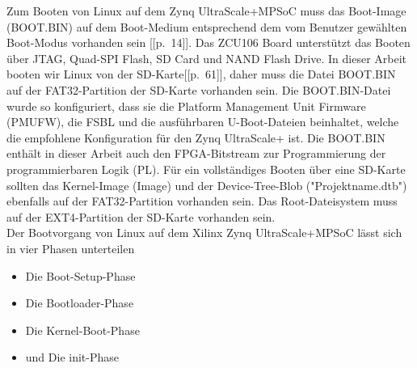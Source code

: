 Zum Booten von Linux auf dem Zynq UltraScale+MPSoC muss das Boot-Image (BOOT.BIN) auf dem Boot-Medium entsprechend dem vom Benutzer gewählten Boot-Modus vorhanden sein [\cite{Xilinx2017}[p.~14]]. Das ZCU106 Board unterstützt das Booten über JTAG, Quad-SPI Flash, SD Card und NAND Flash Drive. In dieser Arbeit booten wir Linux von der SD-Karte[\cite{Xilinx2020}[p.~61]], daher muss die Datei BOOT.BIN auf der FAT32-Partition der SD-Karte vorhanden sein. Die BOOT.BIN-Datei wurde so konfiguriert, dass sie die Platform Management Unit Firmware (PMUFW), die FSBL und die ausführbaren U-Boot-Dateien beinhaltet, welche die empfohlene Konfiguration für den Zynq UltraScale+ ist. Die BOOT.BIN enthält in dieser Arbeit auch den FPGA-Bitstream zur Programmierung der programmierbaren Logik (PL). Für ein vollständiges Booten über eine SD-Karte sollten das Kernel-Image (Image) und der Device-Tree-Blob ("Projektname.dtb") ebenfalls auf der FAT32-Partition vorhanden sein. Das Root-Dateisystem muss auf der EXT4-Partition der SD-Karte vorhanden sein.\\
Der Bootvorgang von Linux auf dem Xilinx Zynq UltraScale+MPSoC lässt sich in vier Phasen unterteilen

\begin{itemize}
	\item Die Boot-Setup-Phase
	\item Die Bootloader-Phase
	\item Die Kernel-Boot-Phase
	\item und Die \grqq init\grqq-Phase
\end{itemize}

